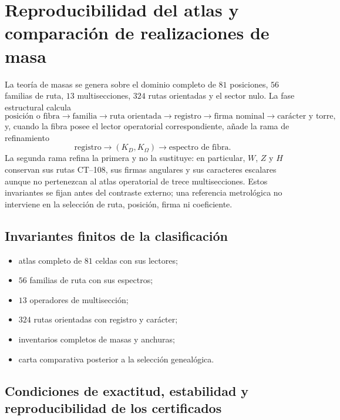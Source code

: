 \HMTDemoteHeadings


\HMTRestoreHeadings

\chapter{Reproducibilidad del atlas y comparación de realizaciones de masa}
\label{app:reproducibilidad-masas-acumulativa}
\label{app:suplemento-digital-masas-rev11}

La teoría de masas se genera sobre el dominio completo de
\(81\) posiciones, \(56\) familias de ruta, \(13\) multisecciones,
\(324\) rutas orientadas y el sector nulo. La fase estructural calcula
\[
\text{posición o fibra}\longrightarrow\text{familia}
\longrightarrow\text{ruta orientada}\longrightarrow\text{registro}
\longrightarrow\text{firma nominal}\longrightarrow\text{carácter y torre},
\]
y, cuando la fibra posee el lector operatorial correspondiente, añade la
rama de refinamiento
\[
 \text{registro}\longrightarrow(K_D,K_\Omega)
 \longrightarrow\text{espectro de fibra}.
\]
La segunda rama refina la primera y no la sustituye: en particular,
\(W\), \(Z\) y \(H\) conservan sus rutas CT--108, sus firmas angulares y
sus caracteres escalares aunque no pertenezcan al atlas operatorial de
trece multisecciones. Estos invariantes se fijan antes del contraste externo;
una referencia metrológica no interviene en la selección de ruta, posición,
firma ni coeficiente.

\section{Invariantes finitos de la clasificación}
\label{sec:fuentes-certificado-tabla-masas-acumulativa}

\begin{itemize}
 \item atlas completo de $81$ celdas con sus lectores;
 \item $56$ familias de ruta con sus espectros;
 \item $13$ operadores de multisección;
 \item $324$ rutas orientadas con registro y carácter;
 \item inventarios completos de masas y anchuras;
 \item carta comparativa posterior a la selección genealógica.
\end{itemize}

\section{Condiciones de exactitud, estabilidad y reproducibilidad de los certificados}
\label{sec:ejecucion-tabla-masas-acumulativa}

